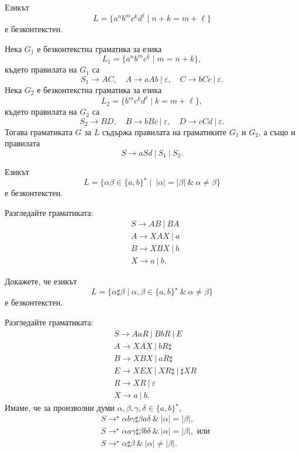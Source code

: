 \newpage
\begin{example}
  Езикът 
  \[L = \{a^nb^mc^kd^\ell \mid n+k = m + \ell\}\]
  е безконтекстен.
\end{example}
\begin{hint}
  Нека $G_1$ е безконтекстна граматика за езика
  \[L_1 = \{a^nb^mc^k \mid m = n+k\},\]
  където правилата на $G_1$ са
  \[S_1 \to AC,\quad  A \to aAb\ |\ \varepsilon,\quad C \to bCc\ |\ \varepsilon.\]
  Нека $G_2$ е безконтекстна граматика за езика 
  \[L_2 = \{b^mc^kd^\ell \mid k = m+\ell\},\]
  където правилата на $G_2$ са
  \[S_2 \to BD,\quad B \to bBc\ |\ \varepsilon,\quad D \to cCd\ |\ \varepsilon.\]
  Тогава граматиката $G$ за $L$ 
  съдържа правилата на граматиките $G_1$ и $G_2$, а също и правилата
  \[S \to aSd\ |\ S_1\ |\ S_2.\]
\end{hint}

\begin{problem}
  \label{prob:equal-but-different}
  Езикът
  \[L = \{\alpha\beta \in \{a,b\}^\star \mid\ |\alpha| = |\beta|\ \&\ \alpha \neq \beta\}\]
  е безконтекстен.
\end{problem}
\begin{hint}
  Разгледайте граматиката:
  \begin{align*}
    & S \to AB\ |\ BA\\
    & A \to XAX\ |\ a\\
    & B \to XBX\ |\ b\\
    & X \to a\ |\ b.
  \end{align*}
\end{hint}

\begin{problem}
 Докажете, че езикът
 \[L = \{\alpha \sharp \beta \mid \alpha,\beta \in \{a,b\}^\star\ \&\ \alpha \neq \beta \}\]
 е безконтекстен.
\end{problem}
\begin{hint}
  Разгледайте граматиката:
  \begin{align*}
    & S \to AaR\ |\ BbR\ |\ E\\
    & A \to XAX\ |\ bR\sharp\\
    & B \to XBX\ |\ aR\sharp\\
    & E \to XEX\ |\ XR\sharp\ |\ \sharp XR\\
    & R \to XR\ |\ \varepsilon\\
    & X \to a\ |\ b.
  \end{align*}
  Имаме, че за произволни думи $\alpha,\beta,\gamma,\delta \in \{a,b\}^\star$,
  \begin{align*}
    & S \to^\star \alpha b \gamma \sharp \beta a \delta\ \&\ |\alpha| = |\beta|,\\
    & S \to^\star \alpha a \gamma \sharp \beta b \delta\ \&\ |\alpha| = |\beta|, \text{ или}\\
    & S \to^\star \alpha \sharp \beta\ \&\ |\alpha| \neq |\beta|.
  \end{align*}      
\end{hint}






